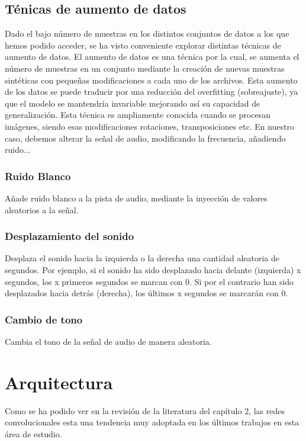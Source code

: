 \documentclass[11pt,a4paper,spanish]{book}
\begin{document}
	
	\subsection{Ténicas de aumento de datos}
	Dado el bajo número de muestras en los distintos conjuntos de datos a los que hemos podido acceder, se ha visto conveniente explorar distintas técnicas de aumento de datos. El aumento de datos es una técnica por la cual, se aumenta el número de muestras en un conjunto mediante la creación de nuevas muestras sintéticas con pequeñas modificaciones a cada uno de los archivos. Esta aumento de los datos se puede traducir por una reducción del overfitting (sobreajuste), ya que el modelo se mantendría invariable mejorando así su capacidad de generalización.
	Esta técnica es ampliamente conocida cuando se procesan imágenes, siendo esas modificaciones rotaciones, transposiciones etc. En nuestro caso, debemos alterar la señal de audio, modificando la frecuencia, añadiendo ruido...
	
	
		\subsubsection{Ruido Blanco}
		Añade ruido blanco a la pista de audio, mediante la inyección de valores aleatorios a la señal.
		
		\subsubsection{Desplazamiento del sonido}
		Desplaza el sonido hacia la izquierda o la derecha una cantidad aleatoria de segundos. Por ejemplo, si el sonido ha sido desplazado hacia delante (izquierda) x segundos, los x primeros segundos se marcan con 0. Si por el contrario han sido desplazados hacia detrás (derecha), los últimos x segundos se marcarán con 0.
		
		\subsubsection{Cambio de tono}
		Cambia el tono de la señal de audio de manera aleatoria.
		
	\section{Arquitectura}
	Como se ha podido ver en la revisión de la literatura del capítulo 2, las redes convolucionales esta una tendencia muy adoptada en los últimos trabajos en esta área de estudio.
	
\end{document}
